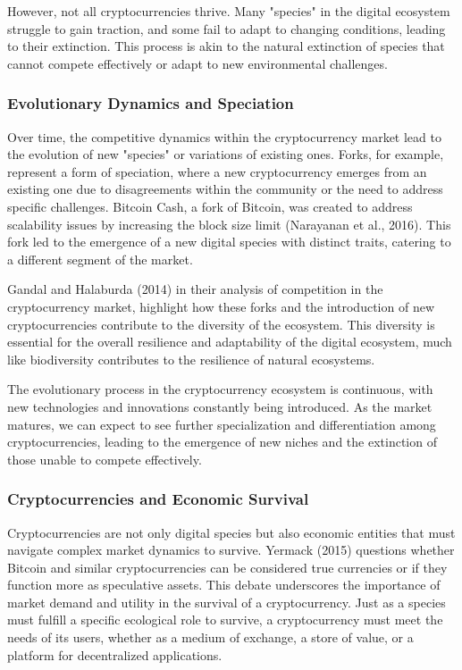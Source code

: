 \documentclass[12pt,twoside]{article}
\begin{document}
However, not all cryptocurrencies thrive. Many "species" in the digital ecosystem struggle to gain traction, and some fail to adapt to changing conditions, leading to their extinction. This process is akin to the natural extinction of species that cannot compete effectively or adapt to new environmental challenges.

\subsubsection{Evolutionary Dynamics and Speciation}

Over time, the competitive dynamics within the cryptocurrency market lead to the evolution of new "species" or variations of existing ones. Forks, for example, represent a form of speciation, where a new cryptocurrency emerges from an existing one due to disagreements within the community or the need to address specific challenges. Bitcoin Cash, a fork of Bitcoin, was created to address scalability issues by increasing the block size limit (Narayanan et al., 2016). This fork led to the emergence of a new digital species with distinct traits, catering to a different segment of the market.

Gandal and Halaburda (2014) in their analysis of competition in the cryptocurrency market, highlight how these forks and the introduction of new cryptocurrencies contribute to the diversity of the ecosystem. This diversity is essential for the overall resilience and adaptability of the digital ecosystem, much like biodiversity contributes to the resilience of natural ecosystems.

The evolutionary process in the cryptocurrency ecosystem is continuous, with new technologies and innovations constantly being introduced. As the market matures, we can expect to see further specialization and differentiation among cryptocurrencies, leading to the emergence of new niches and the extinction of those unable to compete effectively.

\subsubsection{Cryptocurrencies and Economic Survival}

Cryptocurrencies are not only digital species but also economic entities that must navigate complex market dynamics to survive. Yermack (2015) questions whether Bitcoin and similar cryptocurrencies can be considered true currencies or if they function more as speculative assets. This debate underscores the importance of market demand and utility in the survival of a cryptocurrency. Just as a species must fulfill a specific ecological role to survive, a cryptocurrency must meet the needs of its users, whether as a medium of exchange, a store of value, or a platform for decentralized applications.
\end{document}
